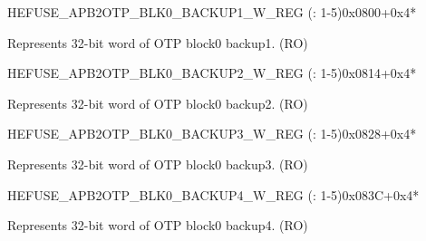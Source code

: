 \begin{register}{H}{EFUSE\_APB2OTP\_BLK0\_BACKUP1\_W\_REG (: 1-5)}{0x0800+0x4*}\label{regdesc:EFUSEAPB2OTPBLK0BACKUP1WNREG}
%
\regnewline%
\begin{regdesc}\begin{reglist}
\label{fielddesc:EFUSEAPB2OTPBLOCK0BACKUP1WN}\item [EFUSE\_APB2OTP\_BLOCK0\_BACKUP1\_W\regindex{n}] Represents 32-bit word  of OTP block0 backup1. (RO)
\end{reglist}\end{regdesc}
\end{register}


\begin{register}{H}{EFUSE\_APB2OTP\_BLK0\_BACKUP2\_W\_REG (: 1-5)}{0x0814+0x4*}\label{regdesc:EFUSEAPB2OTPBLK0BACKUP2WNREG}
%
\regnewline%
\begin{regdesc}\begin{reglist}
\label{fielddesc:EFUSEAPB2OTPBLOCK0BACKUP2WN}\item [EFUSE\_APB2OTP\_BLOCK0\_BACKUP2\_W\regindex{n}] Represents 32-bit word  of OTP block0 backup2. (RO)
\end{reglist}\end{regdesc}
\end{register}


\begin{register}{H}{EFUSE\_APB2OTP\_BLK0\_BACKUP3\_W\_REG (: 1-5)}{0x0828+0x4*}\label{regdesc:EFUSEAPB2OTPBLK0BACKUP3WNREG}
%
\regnewline%
\begin{regdesc}\begin{reglist}
\label{fielddesc:EFUSEAPB2OTPBLOCK0BACKUP3WN}\item [EFUSE\_APB2OTP\_BLOCK0\_BACKUP3\_W\regindex{n}] Represents 32-bit word  of OTP block0 backup3. (RO)
\end{reglist}\end{regdesc}
\end{register}


\begin{register}{H}{EFUSE\_APB2OTP\_BLK0\_BACKUP4\_W\_REG (: 1-5)}{0x083C+0x4*}\label{regdesc:EFUSEAPB2OTPBLK0BACKUP4WNREG}
%
\regnewline%
\begin{regdesc}\begin{reglist}
\label{fielddesc:EFUSEAPB2OTPBLOCK0BACKUP4WN}\item [EFUSE\_APB2OTP\_BLOCK0\_BACKUP4\_W\regindex{n}] Represents 32-bit word  of OTP block0 backup4. (RO)
\end{reglist}\end{regdesc}
\end{register}


